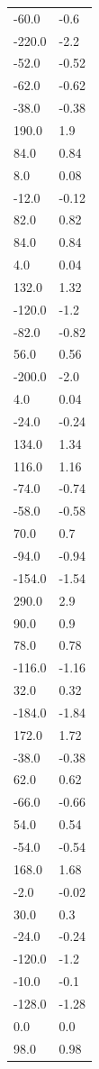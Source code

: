 \begin{longtable}{ll}
-60.0 & -0.6 \\
-220.0 & -2.2 \\
-52.0 & -0.52 \\
-62.0 & -0.62 \\
-38.0 & -0.38 \\
190.0 & 1.9 \\
84.0 & 0.84 \\
8.0 & 0.08 \\
-12.0 & -0.12 \\
82.0 & 0.82 \\
84.0 & 0.84 \\
4.0 & 0.04 \\
132.0 & 1.32 \\
-120.0 & -1.2 \\
-82.0 & -0.82 \\
56.0 & 0.56 \\
-200.0 & -2.0 \\
4.0 & 0.04 \\
-24.0 & -0.24 \\
134.0 & 1.34 \\
116.0 & 1.16 \\
-74.0 & -0.74 \\
-58.0 & -0.58 \\
70.0 & 0.7 \\
-94.0 & -0.94 \\
-154.0 & -1.54 \\
290.0 & 2.9 \\
90.0 & 0.9 \\
78.0 & 0.78 \\
-116.0 & -1.16 \\
32.0 & 0.32 \\
-184.0 & -1.84 \\
172.0 & 1.72 \\
-38.0 & -0.38 \\
62.0 & 0.62 \\
-66.0 & -0.66 \\
54.0 & 0.54 \\
-54.0 & -0.54 \\
168.0 & 1.68 \\
-2.0 & -0.02 \\
30.0 & 0.3 \\
-24.0 & -0.24 \\
-120.0 & -1.2 \\
-10.0 & -0.1 \\
-128.0 & -1.28 \\
0.0 & 0.0 \\
98.0 & 0.98 \\

\end{longtable}
